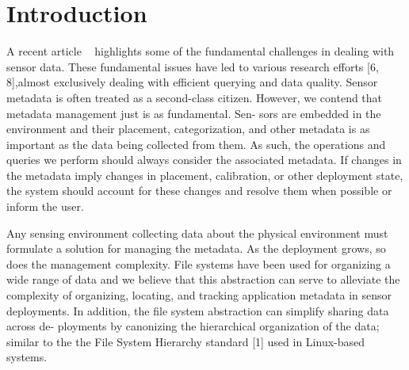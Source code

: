 \section{Introduction}

A recent article ~\cite{sensordatamngt} highlights some of 
the fundamental challenges in dealing with sensor data.
These fundamental issues have led to various research efforts [6, 8],almost exclusively dealing with 
efficient querying and data quality. Sensor metadata is often treated as a second-class citizen. However, we 
contend that metadata management just is as fundamental. Sen- sors are embedded in the environment and their 
placement, categorization, and other metadata is as important as the data being collected from them. As such, 
the operations and queries we perform should always consider the associated metadata. If changes in the metadata 
imply changes in placement, calibration, or other deployment state, the system should account for these changes 
and resolve them when possible or inform the user.

Any sensing environment collecting data about the physical environment must formulate a solution for managing the 
metadata. As the deployment grows, so does the management complexity. File systems have been used for organizing a 
wide range of data and we believe that this abstraction can serve to alleviate the complexity of organizing, locating, 
and tracking application metadata in sensor deployments. In addition, the file system abstraction can simplify sharing 
data across de- ployments by canonizing the hierarchical organization of the data; similar to the the File System Hierarchy 
standard [1] used in Linux-based systems.

